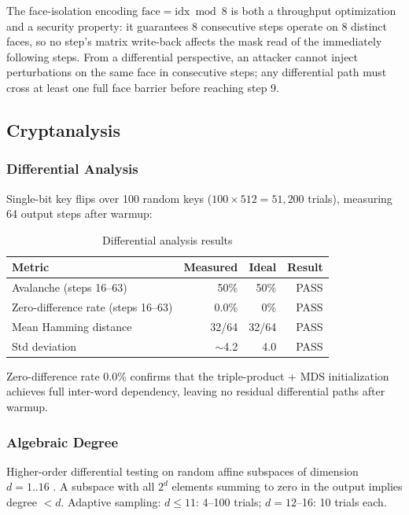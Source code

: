 \documentclass[11pt,a4paper]{article}
\begin{document}
The face-isolation encoding $\mathrm{face} = \mathrm{idx} \bmod 8$ is both a
throughput optimization and a security property: it guarantees 8 consecutive
steps operate on 8 distinct faces, so no step's matrix write-back affects the
mask read of the immediately following steps. From a differential perspective,
an attacker cannot inject perturbations on the same face in consecutive steps;
any differential path must cross at least one full face barrier before reaching
step 9.

\subsection{Cryptanalysis}

\subsubsection{Differential Analysis}

Single-bit key flips over 100 random keys ($100 \times 512 = 51{,}200$ trials),
measuring 64 output steps after warmup:

\begin{table}[H]
\centering
\begin{tabular}{@{}lrrr@{}}
\toprule
\textbf{Metric} & \textbf{Measured} & \textbf{Ideal} & \textbf{Result} \\
\midrule
Avalanche (steps 16--63) & 50\% & 50\% & PASS \\
Zero-difference rate (steps 16--63) & 0.0\% & 0\% & PASS \\
Mean Hamming distance & 32/64 & 32/64 & PASS \\
Std deviation & $\sim$4.2 & 4.0 & PASS \\
\bottomrule
\end{tabular}
\caption{Differential analysis results}
\label{tab:diff}
\end{table}

Zero-difference rate 0.0\% confirms that the triple-product + MDS initialization
achieves full inter-word dependency, leaving no residual differential paths
after warmup.

\subsubsection{Algebraic Degree}

Higher-order differential testing on random affine subspaces of dimension
$d = 1..16$ \cite{biham,courtois}. A subspace with all $2^d$ elements summing
to zero in the output implies degree $< d$. Adaptive sampling:
$d\le 11$: 4--100 trials; $d = 12$--16: 10 trials each.
\end{document}
